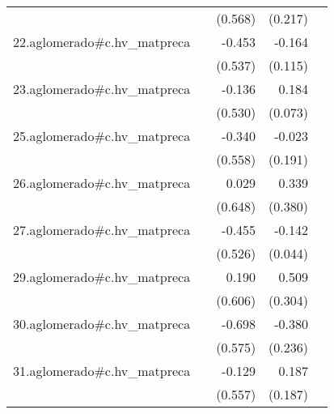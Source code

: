 {\begin{longtable}{l*{4}{D{.}{.}{-1}}}
            &                     &     (0.568)         &     (0.217)         &                     \\
\addlinespace
22.aglomerado#c.hv\_matpreca&                     &      -0.453         &      -0.164         &                     \\
            &                     &     (0.537)         &     (0.115)         &                     \\
\addlinespace
23.aglomerado#c.hv\_matpreca&                     &      -0.136         &       0.184\sym{*}  &                     \\
            &                     &     (0.530)         &     (0.073)         &                     \\
\addlinespace
25.aglomerado#c.hv\_matpreca&                     &      -0.340         &      -0.023         &                     \\
            &                     &     (0.558)         &     (0.191)         &                     \\
\addlinespace
26.aglomerado#c.hv\_matpreca&                     &       0.029         &       0.339         &                     \\
            &                     &     (0.648)         &     (0.380)         &                     \\
\addlinespace
27.aglomerado#c.hv\_matpreca&                     &      -0.455         &      -0.142\sym{**} &                     \\
            &                     &     (0.526)         &     (0.044)         &                     \\
\addlinespace
29.aglomerado#c.hv\_matpreca&                     &       0.190         &       0.509         &                     \\
            &                     &     (0.606)         &     (0.304)         &                     \\
\addlinespace
30.aglomerado#c.hv\_matpreca&                     &      -0.698         &      -0.380         &                     \\
            &                     &     (0.575)         &     (0.236)         &                     \\
\addlinespace
31.aglomerado#c.hv\_matpreca&                     &      -0.129         &       0.187         &                     \\
            &                     &     (0.557)         &     (0.187)         &                     \\

\end{longtable}}
